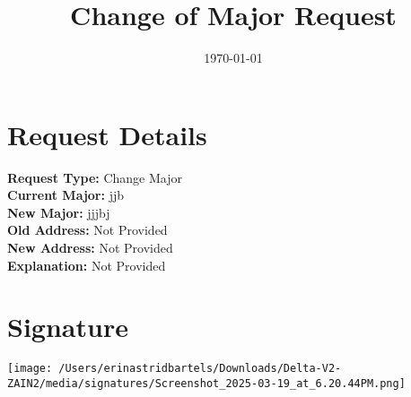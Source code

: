 \documentclass{article}
\begin{document}
\title{Change of Major Request}
\date{\today}

\maketitle



\section*{Request Details}
\textbf{Request Type:} Change Major \\
\textbf{Current Major:} jjb \\
\textbf{New Major:} jjjbj \\
\textbf{Old Address:} Not Provided \\
\textbf{New Address:} Not Provided \\
\textbf{Explanation:} Not Provided

\section*{Signature}
\vspace{1cm}
\texttt{[image: /Users/erinastridbartels/Downloads/Delta-V2-ZAIN2/media/signatures/Screenshot\_2025-03-19\_at\_6.20.44PM.png]} %
\end{document}
